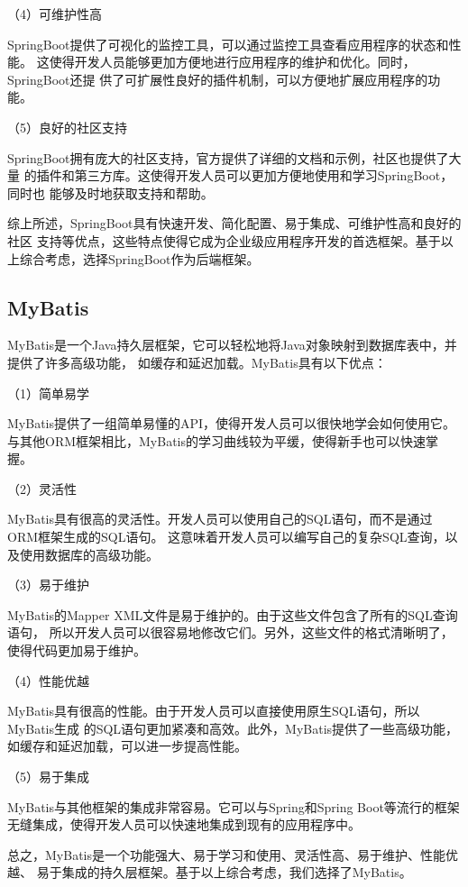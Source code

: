 （4）可维护性高

SpringBoot提供了可视化的监控工具，可以通过监控工具查看应用程序的状态和性能。
这使得开发人员能够更加方便地进行应用程序的维护和优化。同时，SpringBoot还提
供了可扩展性良好的插件机制，可以方便地扩展应用程序的功能。

（5）良好的社区支持

SpringBoot拥有庞大的社区支持，官方提供了详细的文档和示例，社区也提供了大量
的插件和第三方库。这使得开发人员可以更加方便地使用和学习SpringBoot，同时也
能够及时地获取支持和帮助。

综上所述，SpringBoot具有快速开发、简化配置、易于集成、可维护性高和良好的社区
支持等优点，这些特点使得它成为企业级应用程序开发的首选框架。基于以上综合考虑，选择SpringBoot作为后端框架。

\subsection{MyBatis}

MyBatis是一个Java持久层框架，它可以轻松地将Java对象映射到数据库表中，并提供了许多高级功能，
如缓存和延迟加载\cite{21,22}。MyBatis具有以下优点：

（1）简单易学

MyBatis提供了一组简单易懂的API，使得开发人员可以很快地学会如何使用它。
与其他ORM框架相比，MyBatis的学习曲线较为平缓，使得新手也可以快速掌握。

（2）灵活性

MyBatis具有很高的灵活性。开发人员可以使用自己的SQL语句，而不是通过ORM框架生成的SQL语句。
这意味着开发人员可以编写自己的复杂SQL查询，以及使用数据库的高级功能。

（3）易于维护

MyBatis的Mapper XML文件是易于维护的。由于这些文件包含了所有的SQL查询语句，
所以开发人员可以很容易地修改它们。另外，这些文件的格式清晰明了，使得代码更加易于维护。

（4）性能优越

MyBatis具有很高的性能。由于开发人员可以直接使用原生SQL语句，所以MyBatis生成
的SQL语句更加紧凑和高效。此外，MyBatis提供了一些高级功能，如缓存和延迟加载，可以进一步提高性能。

（5）易于集成

MyBatis与其他框架的集成非常容易。它可以与Spring和Spring Boot等流行的框架无缝集成，使得开发人员可以快速地集成到现有的应用程序中。

总之，MyBatis是一个功能强大、易于学习和使用、灵活性高、易于维护、性能优越、
易于集成的持久层框架。基于以上综合考虑，我们选择了MyBatis。

